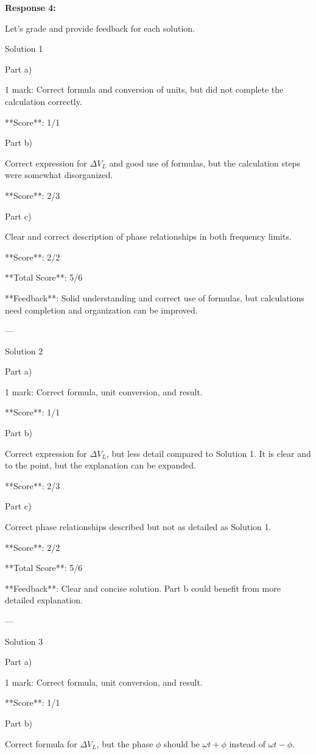 \documentclass[a4paper,11pt]{article}
\begin{document}
\bigskip
\textbf{Response 4:}

Let's grade and provide feedback for each solution.

Solution 1

Part a)

1 mark: Correct formula and conversion of units, but did not complete the calculation correctly.
   
   **Score**: 1/1

Part b)

Correct expression for \(\Delta V_L\) and good use of formulas, but the calculation steps were somewhat disorganized.
   
   **Score**: 2/3

Part c)

Clear and correct description of phase relationships in both frequency limits.
   
   **Score**: 2/2

**Total Score**: 5/6

**Feedback**: Solid understanding and correct use of formulas, but calculations need completion and organization can be improved.

---

Solution 2

Part a)

1 mark: Correct formula, unit conversion, and result.

   **Score**: 1/1

Part b)

Correct expression for \(\Delta V_L\), but less detail compared to Solution 1. It is clear and to the point, but the explanation can be expanded.
   
   **Score**: 2/3

Part c)

Correct phase relationships described but not as detailed as Solution 1.

   **Score**: 2/2

**Total Score**: 5/6

**Feedback**: Clear and concise solution. Part b could benefit from more detailed explanation.

---

Solution 3

Part a)

1 mark: Correct formula, unit conversion, and result.

   **Score**: 1/1

Part b)

Correct formula for \(\Delta V_L\), but the phase \(\phi\) should be \(\omega t + \phi\) instead of \(\omega t - \phi\).
\end{document}
